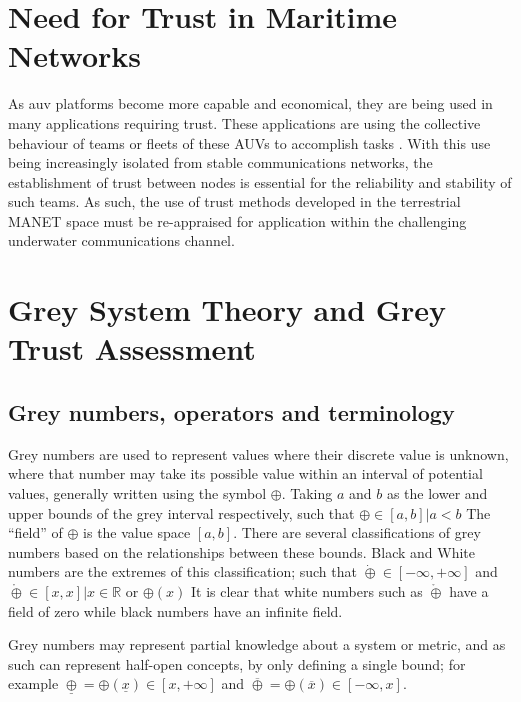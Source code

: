 \section{Need for Trust in Maritime Networks}
 As \acrfull{auv} platforms become more capable and economical, they are being used in many applications requiring trust.
 These applications are using the collective behaviour of teams or fleets of these AUVs to accomplish tasks \cite{Caiti2011}.
 With this use being increasingly isolated from stable communications networks, the establishment of trust between nodes is essential for the reliability and stability of such teams.
 As such, the use of trust methods developed in the terrestrial MANET space must be re-appraised for application within the challenging underwater communications channel.

\section{Grey System Theory and Grey Trust Assessment}
\subsection{Grey numbers, operators and terminology}
Grey numbers are used to represent values where their discrete value is unknown, where that number may take its possible value within an interval of potential values, generally written using the symbol $\oplus$.
Taking $a$ and $b$ as the lower and upper bounds of the grey interval respectively, such that $\oplus \in [a,b] | a < b$ 
The ``field'' of $\oplus$ is the value space $[a,b]$.
There are several classifications of grey numbers based on the relationships between these bounds.
Black and White numbers are the extremes of this classification; such that $\dot\oplus \in [-\infty, +\infty]$ and $\mathring\oplus \in [x, x] | x \in \mathbb{R}$ or $\oplus(x)$
It is clear that white numbers such as $\mathring\oplus$ have a field of zero while black numbers have an infinite field.

Grey numbers may represent partial knowledge about a system or metric, and as such can represent half-open concepts, by only defining a single bound; for example $\underline\oplus = \oplus(\underline x ) \in [x, +\infty]$ and $\overline\oplus = \oplus(\overline x) \in [-\infty, x]$.

